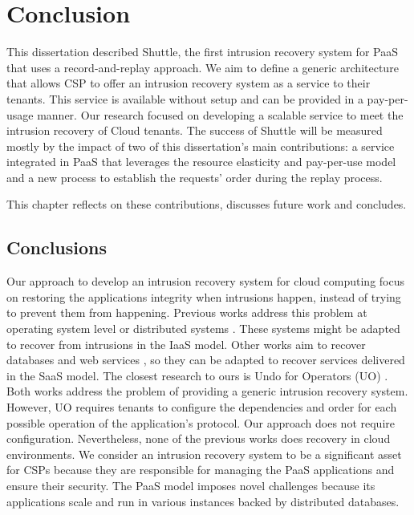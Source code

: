 \chapter{Conclusion}\label{chapter:conclusion}
This dissertation described Shuttle, the first intrusion recovery system for \ac{PaaS} that uses a record-and-replay approach. We aim to define a generic architecture that allows \ac{CSP} to offer an intrusion recovery system as a service to their tenants. This service is available without setup and can be provided in a pay-per-usage manner. Our research focused on developing a scalable service to meet the intrusion recovery of Cloud tenants. The success of Shuttle will be measured mostly by the impact of two of this dissertation's main contributions: a service integrated in \ac{PaaS} that leverages the resource elasticity and pay-per-use model and a new process to establish the requests' order during the replay process.

This chapter reflects on these contributions, discusses future work and concludes.

\section{Conclusions}\label{sec:conclusion:conclusion}
Our approach to develop an intrusion recovery system for cloud computing focus on restoring the applications integrity when intrusions happen, instead of trying to prevent them from happening. Previous works address this problem at operating system level \cite{taser,retro} or distributed systems \cite{aire}. These systems might be adapted to recover from intrusions in the \ac{IaaS} model. Other works aim to recover databases \cite{itdb,phoenix} and web services \cite{warp,goel,aire}, so they can be adapted to recover services delivered in the \ac{SaaS} model. The closest research to ours is Undo for Operators (UO) \cite{undoForOperators}. Both works address the problem of providing a generic intrusion recovery system. However, UO requires tenants to configure the dependencies and order for each possible operation of the application's protocol. Our approach does not require configuration. Nevertheless, none of the previous works does recovery in cloud environments. We consider an intrusion recovery system to be a significant asset for CSPs because they are responsible for managing the \ac{PaaS} applications and ensure their security. The \ac{PaaS} model imposes novel challenges because its applications scale and run in various instances backed by distributed databases. \\

